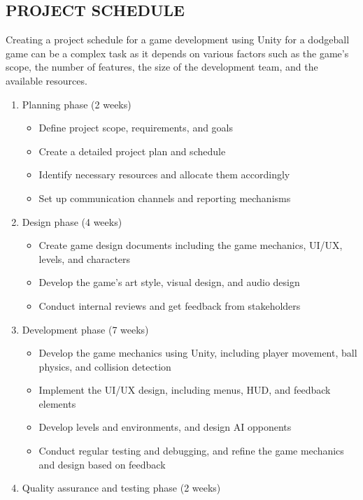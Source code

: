\documentclass[12pt]{report}
\begin{document}
\subsection{PROJECT SCHEDULE}

\justifying
\setlength{\parindent}{4em}
\setlength{\parskip}{0.5em}
\renewcommand{\baselinestretch}{1.5}
\hspace{1.5cm} Creating a project schedule for a game development using Unity for a dodgeball game can be a complex task as it depends on various factors such as the game's scope, the number of features, the size of the development team, and the available resources. 
\begin{enumerate} 
\item Planning phase (2 weeks)
\begin{itemize}
\item Define project scope, requirements, and goals
\item Create a detailed project plan and schedule
\item Identify necessary resources and allocate them accordingly
\item Set up communication channels and reporting mechanisms
\end{itemize}
\item Design phase (4 weeks)
\begin{itemize}
\item Create game design documents including the game mechanics, UI/UX, levels, and characters
\item Develop the game's art style, visual design, and audio design
\item Conduct internal reviews and get feedback from stakeholders
\end{itemize}
\item Development phase (7 weeks)
\begin{itemize}
\item Develop the game mechanics using Unity, including player movement, ball physics, and collision detection
\item Implement the UI/UX design, including menus, HUD, and feedback elements
\item Develop levels and environments, and design AI opponents
\item Conduct regular testing and debugging, and refine the game mechanics and design based on feedback
\end{itemize}
\item Quality assurance and testing phase (2 weeks)
\begin{itemize}

\end{itemize}
\end{enumerate}
\end{document}
